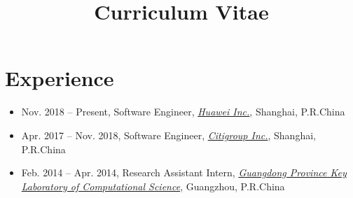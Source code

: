 \documentclass[11pt,a4paper,sans]{moderncv}
\title{Curriculum Vitae}
\newcommand\Colorhref[3][blue]{\href{#2}{\small\color{#1}#3}}
\begin{document}
\makecvtitle

\section{Experience}
\begin{itemize}
	\item Nov. 2018 -- Present, Software Engineer, \Colorhref[blue]{https://www.huawei.com/cn/?ic_medium=direct&ic_source=surlent}{\textit{Huawei Inc.}}, Shanghai, P.R.China
	\item Apr. 2017 -- Nov. 2018, Software Engineer, \Colorhref[blue]{http://www.citigroup.com/china/csts/}{\textit{Citigroup Inc.}}, Shanghai, P.R.China
	\item Feb. 2014 -- Apr. 2014, Research Assistant Intern, \Colorhref[blue]{http://www.compsci.sysu.edu.cn/cn/cn01/index.htm}{\textit{Guangdong Province Key Laboratory of Computational Science}}, Guangzhou, P.R.China
\end{itemize}
\end{document}
